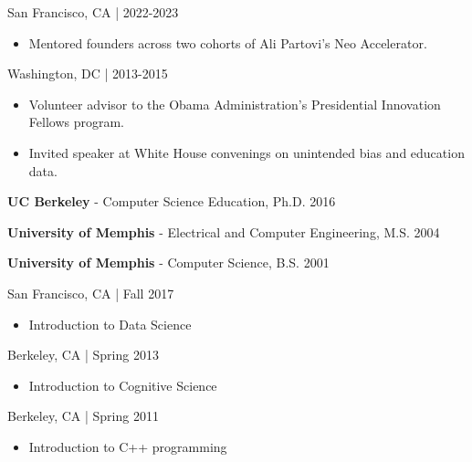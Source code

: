 \documentclass[11pt,article,oneside]{memoir}
\begin{document}
 \hfill San Francisco, CA | 2022-2023
\begin{itemize}[nolistsep]
\item[-]Mentored founders across two cohorts of Ali Partovi's Neo Accelerator.
\end{itemize}

 \hfill Washington, DC | 2013-2015
\begin{itemize}[nolistsep]
\item[-]Volunteer advisor to the Obama Administration's Presidential Innovation Fellows program.
\item[-]Invited speaker at White House convenings on unintended bias and education data.
\end{itemize}

\bigskip


\ind \textbf{UC Berkeley} - Computer Science Education, Ph.D. \hfill 2016

\ind \textbf{University of Memphis} - Electrical and Computer Engineering, M.S. \hfill 2004

\ind \textbf{University of Memphis} - Computer Science, B.S. \hfill 2001

\bigskip

\medskip

 \hfill San Francisco, CA | Fall 2017
\begin{itemize}[noitemsep,nolistsep]
\item[-] Introduction to Data Science
\end{itemize}

 \hfill Berkeley, CA | Spring 2013
\begin{itemize}[noitemsep,nolistsep] 
\item[-] Introduction to Cognitive Science
\end{itemize} 

 \hfill Berkeley, CA | Spring 2011
\begin{itemize}[noitemsep,nolistsep] 
\item[-] Introduction to C++ programming
\end{itemize} 
\end{document}
